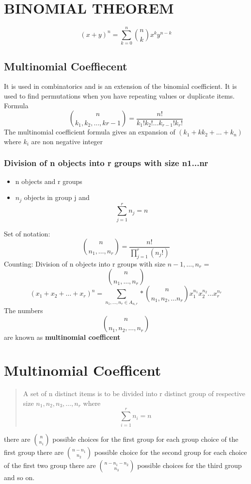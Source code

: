 \documentclass{article}
\begin{document}
\section{BINOMIAL THEOREM}
\begin{equation}
    (x+y)^{n} = \sum_{k=0}^{n}\binom{n}{k}x^{k}y^{n-k}
\end{equation}  
\subsection*{Multinomial Coeffiecent}
It is used in combinatorics and is an extension of the binomial coefficient. It is used to find permutations when you have repeating values or duplicate items. \\
Formula 
\begin{equation}
    \binom{n}{k_{1},k_{2},...,k{r-1}}= \frac{n!}{k_{1}!k_{2}!\ldots k_{r-1}!k_{r}!}
\end{equation}
The multinomial coefficient formula gives an expansion of $(k_{1}+kk_{2}+\ldots + k_{n})$ where $k_{i}$ are non negative integer
\subsubsection{Division of n objects into r groups with size n1...nr}
\begin{itemize}
    \item n objects and r groups 
    \item $n_{j}$ objects in group j and \[\sum_{j=1}^{r}n_{j}=n\]
\end{itemize}
Set of notation:
\[\binom{n}{n_{1},\ldots,n_{r}}= \frac{n!}{\prod_{j=1}^{r}(n_{j}!)}\]
Counting: Division of n objects into r groups with size $n-{1}, \ldots, n_{r}$ = \[\binom{n}{n_{1},\ldots,n_{r}}\]
\begin{equation}
    (x_{1}+x_{2}+\ldots + x_{r})^n = \sum_{n_{1},\ldots,n_{r}\in
    A_{n,r}}*\binom{n}{n_{1},n_{2},\ldots n_{r}}x_{1}^{n_1}x_{2}^{n_2}\ldots x_{r}^{n_r}  
\end{equation}
The numbers \[ \binom{n}{n_1, n_2,\ldots, n_r}\] are known as \textbf{multinomial coefficent}
\section*{Multinomial Coefficent}
\begin{abstract}
    A set of n distinct items is to be divided into r distinct group of respective size $n_{1}, n_{2},n_{3},\ldots, n_{r}$ where \begin{equation}
        \sum_{i=1}^{r}n_{i} = n
    \end{equation}
\end{abstract}
there are $\binom{n}{n_{1}}$ possible choices for the first group for each group choice of the first group there are $\binom{n-n_{1}}{n_{2}}$ possible choice for the second group for each choice of the first two group there are $\binom{n-n_{1}-n_{2}}{n_{3}}$ possible choices for the third group and so on.\\
\end{document}
